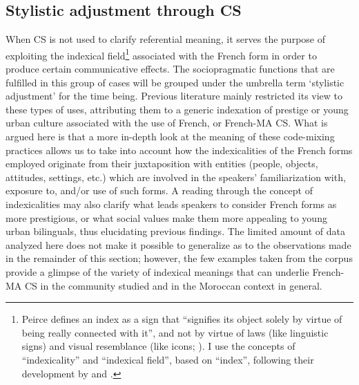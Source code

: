 \documentclass[output=paper]{langscibook}
\begin{document}
\subsection{Stylistic adjustment through \gls*{CS}}
When \gls*{CS} is not used to clarify referential meaning, it serves the purpose of exploiting the indexical field\footnote{Peirce defines an index as a sign that “signifies its object solely by virtue of being really connected with it”, and not by virtue of laws (like linguistic signs) and visual resemblance (like icons; \citealt[361]{peirce_algebra_1933}). I use the concepts of ``indexicality'' and ``indexical field'', based on  ``index'', following their development by \citet{silverstein_shifters_1976,silverstein_indexical_2003} and \citet{eckert_variation_2008}.} associated with the French form in order to produce certain communicative effects. The sociopragmatic functions that are fulfilled in this group of cases will be grouped under the umbrella term ‘stylistic adjustment' for the time being. Previous literature mainly restricted its view to these types of uses, attributing them to a generic indexation of prestige or young urban culture associated with the use of French, or French-\gls*{MA} \gls*{CS}. What is argued here is that a more in-depth look at the meaning of these code-mixing practices allows us to take into account how the indexicalities of the French forms employed originate from their juxtaposition with entities (people, objects, attitudes, settings, etc.) which are involved in the speakers’ familiarization with, exposure to, and/or use of such forms. A reading through the concept of indexicalities may also clarify what leads speakers to consider French forms as more prestigious, or what social values make them more appealing to young urban bilinguals, thus elucidating previous findings. The limited amount of data analyzed here does not make it possible to generalize as to the observations made in the remainder of this section; however, the few examples taken from the corpus provide a glimpse of the variety of indexical meanings that can underlie French-\gls*{MA} \gls*{CS} in the community studied and in the Moroccan context in general.
\end{document}
